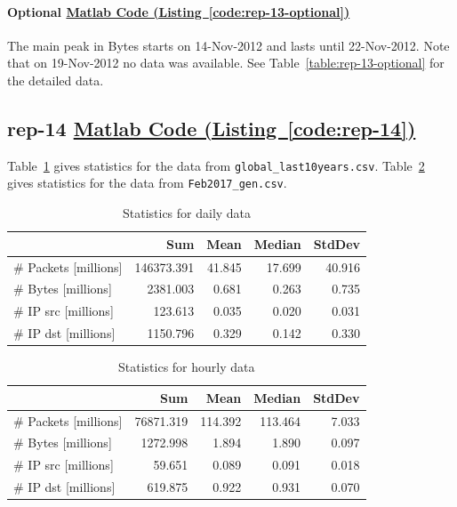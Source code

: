 \documentclass{article}
\newcommand{\codelink}[1]{%
    \hyperref[#1]{\quad\faArrowCircleRight\enskip Matlab Code (Listing~\ref{#1})}%
}
\begin{document}
\paragraph{Optional \codelink{code:rep-13-optional}}

The main peak in Bytes starts on 14-Nov-2012 and lasts until 22-Nov-2012. Note that
on 19-Nov-2012 no data was available. See Table~\ref{table:rep-13-optional}
for the detailed data.

\subsection{rep-14 \codelink{code:rep-14}}

Table~\ref{table:rep-14-daily} gives statistics for the data from
\texttt{global\_last10years.csv}. Table~\ref{table:rep-14-hourly} gives
statistics for the data from \texttt{Feb2017\_gen.csv}.

\begin{table}[H]
    \centering
    \begin{tabular}{l|rrrr}
                & Sum & Mean & Median & StdDev \\
                \hline
        \# Packets [millions] &   146373.391 & 41.845 & 17.699 & 40.916 \\
        \# Bytes [millions]   &    2381.003 & 0.681 & 0.263 & 0.735 \\
        \# IP src [millions]     & 123.613 & 0.035 & 0.020 & 0.031 \\
        \# IP dst  [millions]    & 1150.796 & 0.329 & 0.142 & 0.330 \\
    \end{tabular}
    \caption{\label{table:rep-14-daily} Statistics for daily data}
\end{table}

\begin{table}[H]
    \centering
    \begin{tabular}{l|rrrr}
                & Sum & Mean & Median & StdDev \\
                \hline
        \# Packets [millions] &    76871.319 & 114.392 & 113.464 & 7.033 \\
        \# Bytes  [millions]  &    1272.998  &1.894 & 1.890 & 0.097      \\
        \# IP src  [millions]    & 59.651 & 0.089 & 0.091 & 0.018        \\
        \# IP dst   [millions]   & 619.875 & 0.922 & 0.931 & 0.070       \\
    \end{tabular}
    \caption{\label{table:rep-14-hourly} Statistics for hourly data}
\end{table}
\end{document}
